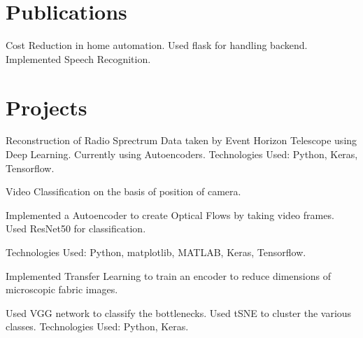 \documentclass[a4paper]{deedy-resume-openfont}
\begin{document}
\begin{minipage}[t]{0.66\textwidth}
\section{Publications}

Cost Reduction in home automation. Used flask for handling backend. Implemented Speech Recognition.  


\section{Projects}
Reconstruction of Radio Sprectrum Data taken by Event Horizon Telescope using Deep Learning. Currently using Autoencoders. 
Technologies Used: Python, Keras, Tensorflow. 
\sectionsep

\begin{tightemize}
\item Video Classification on the basis of position of camera. \item Implemented a Autoencoder to create Optical Flows by taking video frames. Used ResNet50 for classification.
\item Technologies Used: Python, matplotlib, MATLAB, Keras, Tensorflow.
\end{tightemize}
\sectionsep

\begin{tightemize}
\item Implemented Transfer Learning to train an encoder to reduce dimensions of microscopic fabric images. \item Used VGG network to classify the bottlenecks. Used tSNE to cluster the various classes. Technologies Used: Python, Keras.
\end{tightemize}
\sectionsep



\end{minipage}
\end{document}
